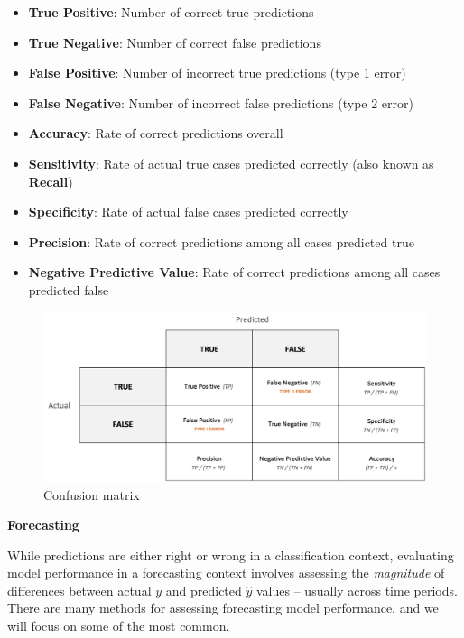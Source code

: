 \documentclass[
]{book}
\providecommand{\tightlist}{%
  \setlength{\itemsep}{0pt}\setlength{\parskip}{0pt}}
\begin{document}
\begin{itemize}
\tightlist
\item
  \textbf{True Positive}: Number of correct true predictions
\item
  \textbf{True Negative}: Number of correct false predictions
\item
  \textbf{False Positive}: Number of incorrect true predictions (type 1 error)
\item
  \textbf{False Negative}: Number of incorrect false predictions (type 2 error)
\item
  \textbf{Accuracy}: Rate of correct predictions overall
\item
  \textbf{Sensitivity}: Rate of actual true cases predicted correctly (also known as \textbf{Recall})
\item
  \textbf{Specificity}: Rate of actual false cases predicted correctly
\item
  \textbf{Precision}: Rate of correct predictions among all cases predicted true
\item
  \textbf{Negative Predictive Value}: Rate of correct predictions among all cases predicted false
\end{itemize}

\begin{figure}

{\centering \includegraphics[width=1\linewidth]{graphics/confusion_matrix} 

}

\caption{Confusion matrix}\label{fig:confusion-mtx}
\end{figure}

\textbf{Forecasting}

While predictions are either right or wrong in a classification context, evaluating model performance in a forecasting context involves assessing the \emph{magnitude} of differences between actual \(y\) and predicted \(\hat y\) values -- usually across time periods. There are many methods for assessing forecasting model performance, and we will focus on some of the most common.
\end{document}
